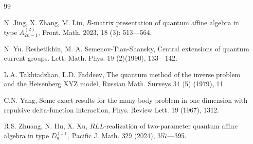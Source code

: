 \documentclass[10pt,a4paper]{amsart}
\numberwithin{equation}{section}
\begin{document}
\begin{thebibliography}{99}
		
	N. Jing, X. Zhang, M. Liu, $R$-matrix presentation of quantum affine algebra in type $A_{2 n-1}^{(2)}$, Front. Math. 2023, 18 (3): 513---564.  %
		
	 N. Yu. Reshetikhin, M. A. Semenov-Tian-Shansky, Central extensions of quantum current groups. Lett. Math. Phys. 19 (2)(1990),  133---142.
	
	
	L.A. Takhtadzhan, L.D. Faddeev, The quantum method of the inverse problem and the Heisenberg XYZ model, Russian Math. Surveys 34 (5) (1979), 11.   %
	
	
	C.N. Yang, Some exact results for the many-body problem in one dimension with repulsive delta-function interaction, Phys. Review Lett. 19 (1967), 1312.

	
	 R.S. Zhuang, N. Hu, X. Xu, $RLL$-realization of two-parameter quantum affine algebra in type $D_n^{(1)}$, Pacific J. Math. 329 (2024), 357---395.
\end{thebibliography}
\end{document}
